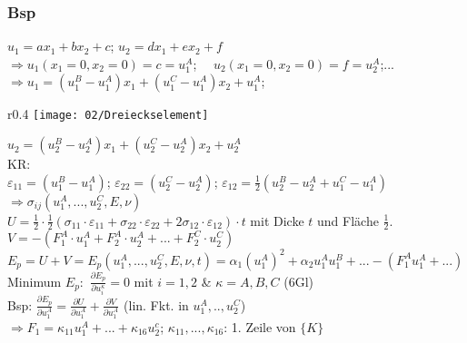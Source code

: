         \subsubsection{Bsp}
            $u_1=ax_1+bx_2+c$; $u_2=dx_1+ex_2+f$\\
            $\Rightarrow u_1(x_1=0,x_2=0)=c=u_1^A$; $\quad u_2(x_1=0,x_2=0)=f=u_2^A$;...\\
            $\Rightarrow u_1=(u_1^B-u_1^A)x_1+(u_1^C-u_1^A)x_2+u_1^A$;\\
            \begin{wrapfigure}[6]{r}{0.4\linewidth}
                \vspace{-8mm}
                \texttt{[image: 02/Dreieckselement]}
            \end{wrapfigure}
            $u_2=(u_2^B-u_2^A)x_1+(u_2^C-u_2^A)x_2+u_2^A$\\
            KR:\\
            $\varepsilon_{11}=(u_1^B-u_1^A)$; $\varepsilon_{22}=(u_2^C-u_2^A)$; $\varepsilon_{12}=\frac{1}{2}(u_2^B-u_2^A+u_1^C-u_1^A)$
            $\Rightarrow\sigma_{ij}(u_1^A,...,u_2^C,E,\nu)$\\
            $U=\frac{1}{2}\cdot\frac{1}{2}(\sigma_{11}\cdot\varepsilon_{11}+\sigma_{22}\cdot\varepsilon_{22}+2\sigma_{12}\cdot\varepsilon_{12})\cdot t$ mit Dicke $t$ und Fläche $\frac{1}{2}$.\\
            $V=-(F_1^A\cdot u_1^A+F_2^A\cdot u_2^A+...+F_2^C\cdot u_2^C)$\\
            $E_p=U+V=E_p(u_1^A,...,u_2^C,E,\nu,t)=\alpha_1(u_1^A)^2+\alpha_2u_1^Au_1^B+ ...-(F_1^Au_1^A+...)$\\
            Minimum $E_p:$ $\frac{\partial E_p}{\partial u_i^\kappa}=0$ mit $i=1,2$ \& $\kappa=A,B,C$ (6Gl)\\
            Bsp: $\frac{\partial E_p}{\partial u_1^A}=\frac{\partial U}{\partial u_1^A}+\frac{\partial V}{\partial u_1^A}$ (lin. Fkt. in $u_1^A,..,u_2^C$) \\$\Rightarrow F_1=\kappa_{11}u_1^A+...+\kappa_{16}u_2^c$; $\kappa_{11},...,\kappa_{16}$: 1. Zeile von $\{K\}$